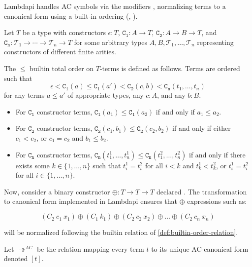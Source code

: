 Lambdapi handles \ac{AC} symbols via the modifiers , normalizing terms to a canonical form using a built-in ordering (\cite{ACorigin}, \cite[\S 5]{univAC}).

\begin{definition}\label{def:builtin-order-relation}
Let $T$ be a type with constructors $\epsilon : T$, $\mathtt{C_1} : A \to T$, $\mathtt{C_2} : A \to B \to T$, and $\mathtt{C_n} : \mathcal{T}_1 \to \cdots \to \mathcal{T}_n \to T$ for some arbitrary types $A, B, \mathcal{T}_1, \ldots, \mathcal{T}_n$ representing constructors of different finite arities.

The $\leq$ builtin total order on $T$-terms is defined as follows. Terms are ordered such that
\[
  \epsilon < \mathtt{C_1}(a) \leq \mathtt{C_1}(a') < \mathtt{C_2}(c, b) < \mathtt{C_n}(t_1, \ldots, t_n)
\]
for any terms $a \leq a'$ of appropriate types, any $c : A$, and any $b : B$.

\begin{itemize}
\item For $\mathtt{C_1}$ constructor terms, $\mathtt{C_1}(a_1) \leq \mathtt{C_1}(a_2)$ if and only if $a_1 \leq a_2$.

  \item For $\mathtt{C_2}$ constructor terms, $\mathtt{C_2}(c_1, b_1) \leq \mathtt{C_2}(c_2, b_2)$ if and only if either $c_1 < c_2$, or $c_1 = c_2$ and $b_1 \leq b_2$.

  \item For $\mathtt{C_n}$ constructor terms, $\mathtt{C_n}(t_1^{1}, \ldots, t_n^{1}) \leq \mathtt{C_n}(t_1^{2}, \ldots, t_n^{2})$ if and only if there exists some $k \in \{1, \ldots, n\}$ such that $t_i^{1} = t_i^{2}$ for all $i < k$ and $t_k^{1} < t_k^{2}$, or $t_i^{1} = t_i^{2}$ for all $i \in \{1, \ldots, n\}$.
\end{itemize}
\end{definition}

Now, consider a binary constructor $\oplus: T \to T \to T$ declared .
The transformation to canonical form implemented in Lambdapi ensures that $\oplus$ expressions such as:

\[
  (C_2~c_1~x_1) \oplus (C_1~k_1) \oplus (C_2~c_2~x_2) \oplus \dots \oplus (C_2~c_n~x_n)
\]

will be normalized following the builtin relation of \cref{def:builtin-order-relation}.

\begin{definition}
Let $\twoheadrightarrow^{AC}$  be the relation mapping every term $t$ to its unique AC-canonical form denoted $[t]$.
\end{definition}


